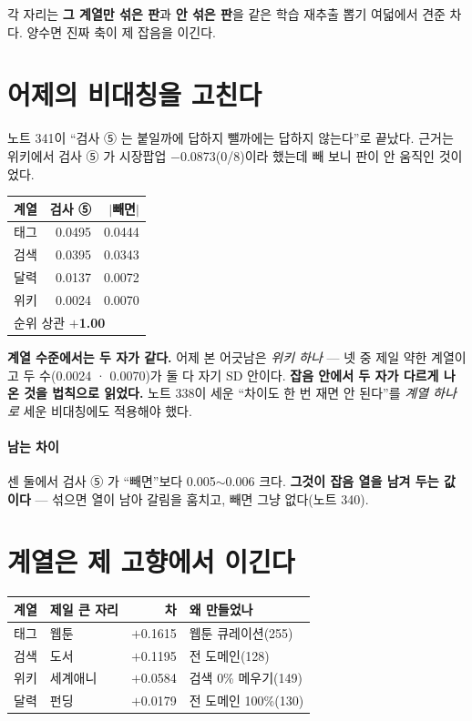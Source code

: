 \documentclass[10pt]{article}
\begin{document}
각 자리는 \textbf{그 계열만 섞은 판}과 \textbf{안 섞은 판}을 같은 학습
재추출 뽑기 여덟에서 견준 차다. 양수면 진짜 축이 제 잡음을 이긴다.

\section{어제의 비대칭을 고친다}

노트 341이 ``검사 ⑤ 는 붙일까에 답하지 뺄까에는 답하지 않는다''로 끝났다.
근거는 위키에서 검사 ⑤ 가 시장팝업 $-$0.0873(0/8)이라 했는데 빼 보니
판이 안 움직인 것이었다.

\begin{center}\small
\begin{tabular}{lrr}
\hline
계열 & 검사 ⑤ & $|$빼면$|$ \\
\hline
태그 & 0.0495 & 0.0444 \\
검색 & 0.0395 & 0.0343 \\
달력 & 0.0137 & 0.0072 \\
위키 & 0.0024 & 0.0070 \\
\hline
\multicolumn{3}{l}{순위 상관 \textbf{$+$1.00}} \\
\hline
\end{tabular}
\end{center}

\textbf{계열 수준에서는 두 자가 같다.} 어제 본 어긋남은 \emph{위키 하나}
--- 넷 중 제일 약한 계열이고 두 수(0.0024 · 0.0070)가 둘 다 자기 SD
안이다. \textbf{잡음 안에서 두 자가 다르게 나온 것을 법칙으로 읽었다.}
노트 338이 세운 ``차이도 한 번 재면 안 된다''를 \emph{계열 하나로} 세운
비대칭에도 적용해야 했다.

\paragraph{남는 차이} 센 둘에서 검사 ⑤ 가 ``빼면''보다 0.005$\sim$0.006
크다. \textbf{그것이 잡음 열을 남겨 두는 값이다} --- 섞으면 열이 남아
갈림을 훔치고, 빼면 그냥 없다(노트 340).

\section{계열은 제 고향에서 이긴다}

\begin{center}\footnotesize
\begin{tabular}{llrl}
\hline
계열 & 제일 큰 자리 & 차 & 왜 만들었나 \\
\hline
태그 & 웹툰 & $+$0.1615 & 웹툰 큐레이션(255) \\
검색 & 도서 & $+$0.1195 & 전 도메인(128) \\
위키 & 세계애니 & $+$0.0584 & 검색 0\% 메우기(149) \\
달력 & 펀딩 & $+$0.0179 & 전 도메인 100\%(130) \\
\hline
\end{tabular}
\end{center}
\end{document}
